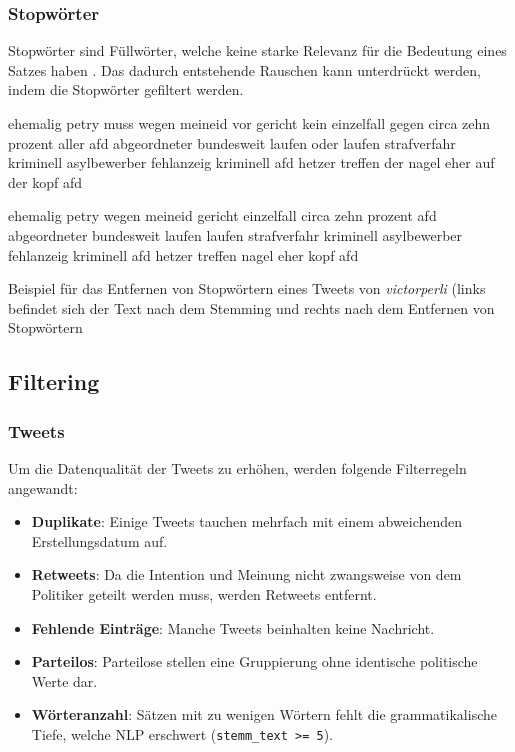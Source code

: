 \subsubsection{Stopwörter}


Stopwörter sind Füllwörter, welche keine starke Relevanz für die Bedeutung eines Satzes haben \autocite[4]{kowsari_text_2019}. Das dadurch entstehende Rauschen kann unterdrückt werden, indem die Stopwörter gefiltert werden.


\begin{code}[H]
    \begin{minipage}{0.45\textwidth}
        \small
        ehemalig petry muss wegen meineid vor gericht kein einzelfall gegen circa zehn prozent aller afd abgeordneter bundesweit laufen oder laufen strafverfahr kriminell asylbewerber fehlanzeig kriminell afd hetzer treffen der nagel eher auf der kopf afd
    \end{minipage}\hfill
    \begin{minipage}{0.45\textwidth}
        \small
        ehemalig petry wegen meineid gericht einzelfall circa zehn prozent afd abgeordneter bundesweit laufen laufen strafverfahr kriminell asylbewerber fehlanzeig kriminell afd hetzer treffen nagel eher kopf afd
    \end{minipage}\hfill
    \caption[Beispiel -- Entfernen von Stopwörtern]{Beispiel für das Entfernen von Stopwörtern eines Tweets von \textit{victorperli} (links befindet sich der Text nach dem Stemming und rechts nach dem Entfernen von Stopwörtern} \label{list:stopwords}
\end{code}

\subsection{Filtering} \label{subsec:filtering}

\subsubsection{Tweets}

Um die Datenqualität der Tweets zu erhöhen, werden folgende Filterregeln angewandt:

\begin{itemize}
    \item \textbf{Duplikate}: Einige Tweets tauchen mehrfach mit einem abweichenden Erstellungsdatum auf.
    \item \textbf{Retweets}: Da die Intention und Meinung nicht zwangsweise von dem Politiker geteilt werden muss, werden Retweets entfernt.
    \item \textbf{Fehlende Einträge}: Manche Tweets beinhalten keine Nachricht.
    \item \textbf{Parteilos}: Parteilose stellen eine Gruppierung ohne identische politische Werte dar.
    \item \textbf{Wörteranzahl}: Sätzen mit zu wenigen Wörtern fehlt die grammatikalische Tiefe, welche \ac{NLP} erschwert (\texttt{stemm\_text >= 5}).
\end{itemize}

